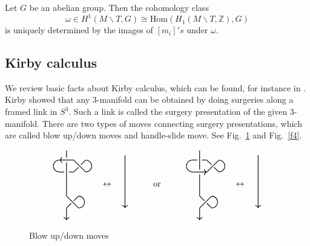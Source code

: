 \documentclass[12pt]{amsart}
\begin{document}
Let $G$ be an abelian group. Then the cohomology class  $$\omega\in H^1(M\backslash T, G)\cong \mathrm{Hom} (H_1(M\backslash T, \mathbb{Z}), G)$$ is uniquely determined by the images of $[m_i]'s$ under $\omega$.

\subsection{Kirby calculus}
We review basic facts about Kirby calculus, which can be found, for instance in \cite[5.1]{MR3286896}. Kirby \cite{MR467753} showed that any $3$-manifold can be obtained by doing surgeries along a framed link in $S^3$. Such a link is called the surgery presentation of the given $3$-manifold. There are two types of moves connecting surgery presentations, which are called blow up/down moves and handle-slide move. See Fig.~\ref{f3} and Fig.~\ref{f4}.

\begin{figure}
\begin{align*}
\begin{tikzpicture}[baseline=-0.65ex, thick, scale=1]
\draw (0,-0.5) to (0,0.9);
\draw (0,1.1) to (0,1.4);
\draw (-0.3,1) [<-]to (0.3,1);
\draw (-0.3,0.5) to (-0.1,0.5);
\draw (0.1,0.5) to (0.3,0.5);
\draw  (-0.3,1) arc (90:270:0.25);
\draw (0.3,1) to (0.8,0.5);
\draw (0.3,0.5) to (0.5,0.7);
\draw (0.8,1) to (0.6,0.8);
\draw (0,-0.5) to (0.5,-1);
\draw (0.8,0.5) arc (-90:90:0.25);
\draw (0,-1) to (0.2,-0.8);
\draw (0.3,-0.7) to (0.5,-0.5);
\draw (0.5,-1) arc (-90:90:0.25);
\draw (0,-1) [->]  to (0,-1.5);
\end{tikzpicture} \quad \leftrightarrow \quad \begin{tikzpicture}[baseline=-0.65ex, thick, scale=1]
\draw (0.5,-1) [<-]  to (0.5,1.2);
\end{tikzpicture}\quad\quad\quad \text{or}\quad\quad\quad
\begin{tikzpicture}[baseline=-0.65ex, thick, scale=1]
\draw (0,-0.5) to (0,0.4);
\draw (0,0.6) to (0,1.4);
\draw (-0.3,0.5) [->]to (0.3,0.5);
\draw (-0.3,1) to (-0.1,1);
\draw (0.1,1) to (0.3,1);
\draw  (-0.3,1) arc (90:270:0.25);
\draw (0.3,1) to (0.5,0.8);
\draw (0.6,0.7) to (0.8,0.5);
\draw (0.3,0.5) to (0.8,1);
\draw (0,-0.5) to (0.2,-0.7);
\draw (0.3,-0.8) to (0.5,-1);
\draw (0.8,0.5) arc (-90:90:0.25);
\draw (0,-1) to (0.5,-0.5);
\draw (0.5,-1) arc (-90:90:0.25);
\draw (0,-1) [->]  to (0,-1.5);
\end{tikzpicture}\quad \leftrightarrow \quad \begin{tikzpicture}[baseline=-0.65ex, thick, scale=1]
\draw (0.5,-1) [<-]  to (0.5,1.2);
\end{tikzpicture}
\end{align*}
\caption{Blow up/down moves}
\label{f3}
\end{figure}
\end{document}
